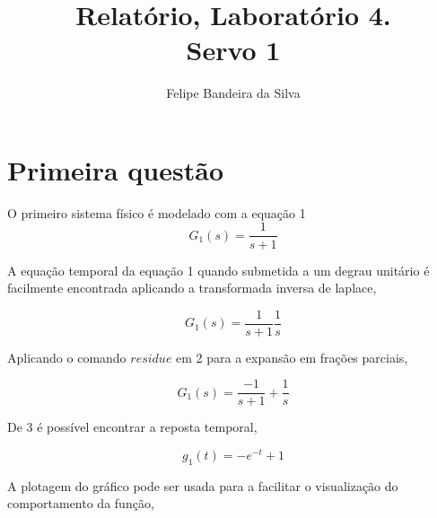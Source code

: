 \documentclass[paper=a4, fontsize=11pt]{article}
\title{Relatório, Laboratório 4.\\Servo 1}
\author{Felipe Bandeira da Silva}
\begin{document}






\newpage

\section{Primeira questão}

O primeiro sistema físico é modelado com a equação 1
\begin{equation}
    G_1(s) = \frac{1}{s+1}
\end{equation}

A equação temporal da equação 1 quando submetida a um degrau unitário
é facilmente encontrada aplicando a transformada inversa de laplace,

\begin{equation}
    G_1(s) = \frac{1}{s+1} \frac{1}{s}
\end{equation}

Aplicando o comando $residue$ em 2 para a expansão em frações parciais,

\begin{equation}
    G_1(s) = \frac{-1}{s+1} + \frac{1}{s}
\end{equation}

De 3 é possível encontrar a reposta temporal,

\begin{equation}
    g_1(t) = -e^{-t} + 1
\end{equation}

A plotagem do gráfico pode ser usada para a facilitar o visualização
do comportamento da função,
\end{document}
